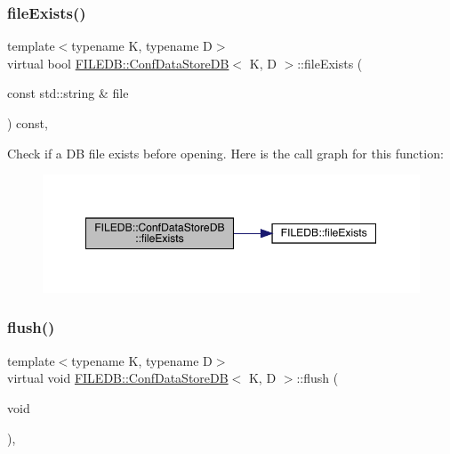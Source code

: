 \subsubsection{\texorpdfstring{fileExists()}{fileExists()}\hspace{0.1cm}{\footnotesize\ttfamily [3/3]}}
{\footnotesize\ttfamily template$<$typename K, typename D$>$ \\
virtual bool \mbox{\hyperlink{classFILEDB_1_1ConfDataStoreDB}{F\+I\+L\+E\+D\+B\+::\+Conf\+Data\+Store\+DB}}$<$ K, D $>$\+::file\+Exists (\begin{DoxyParamCaption}\item[{const std\+::string \&}]{file }\end{DoxyParamCaption}) const\hspace{0.3cm}{\ttfamily [inline]}, {\ttfamily [virtual]}}

Check if a DB file exists before opening. Here is the call graph for this function\+:
\nopagebreak
\begin{figure}[H]
\begin{center}
\leavevmode
\includegraphics[width=349pt]{d8/d19/classFILEDB_1_1ConfDataStoreDB_aec1d15aa66421b99e7cd1151e12d2f17_cgraph}
\end{center}
\end{figure}
\mbox{\label{classFILEDB_1_1ConfDataStoreDB_a982ae3b2108acbf75ab15a939fc7871b}} 
\subsubsection{\texorpdfstring{flush()}{flush()}\hspace{0.1cm}{\footnotesize\ttfamily [1/3]}}
{\footnotesize\ttfamily template$<$typename K, typename D$>$ \\
virtual void \mbox{\hyperlink{classFILEDB_1_1ConfDataStoreDB}{F\+I\+L\+E\+D\+B\+::\+Conf\+Data\+Store\+DB}}$<$ K, D $>$\+::flush (\begin{DoxyParamCaption}\item[{void}]{ }\end{DoxyParamCaption})\hspace{0.3cm}{\ttfamily [inline]}, {\ttfamily [virtual]}}

